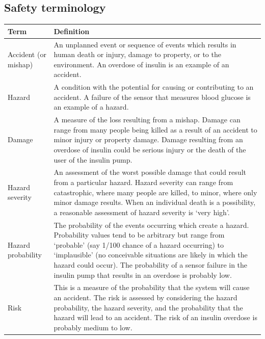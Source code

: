 \subsection{Safety terminology}
\begin{table}[h!]
\centering
\begin{tabular}{ |p{3cm}|p{8cm}|  }
\hline
Term & Definition \\
\hline
\hline
Accident (or mishap) & An unplanned event or sequence of events which results in human death or injury, damage to property, or to the environment. An overdose of insulin is an example of an accident.\\
 \hline
Hazard & A condition with the potential for causing or contributing to an accident. A failure of the sensor that measures blood glucose is an example of a hazard.\\
\hline
Damage & A measure of the loss resulting from a mishap. Damage can range from many people being killed as a result of an accident to minor injury or property damage. Damage resulting from an overdose of insulin could be serious injury or the death of the user of the insulin pump.\\
\hline
Hazard severity & An assessment of the worst possible damage that could result from a particular hazard. Hazard severity can range from catastrophic, where many people are killed, to minor, where only minor damage results. When an individual death is a possibility, a reasonable assessment of hazard severity is ‘very high’.\\
\hline
Hazard probability & The probability of the events occurring which create a hazard. Probability values tend to be arbitrary but range from ‘probable’ (say 1/100 chance of a hazard occurring) to ‘implausible’ (no conceivable situations are likely in which the hazard could occur). The probability of a sensor failure in the insulin pump that results in an overdose is probably low.\\
\hline
Risk & This is a measure of the probability that the system will cause an accident. The risk is assessed by considering the hazard probability, the hazard severity, and the probability that the hazard will lead to an accident. The risk of an insulin overdose is probably medium to low.\\
\hline
\end{tabular}

\label{table:T4_2}
\end{table}

